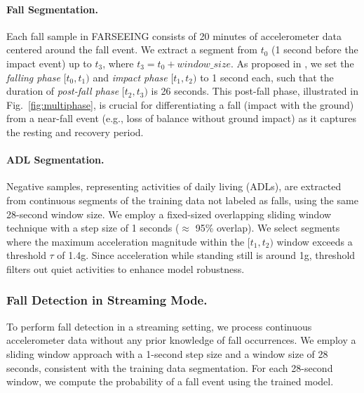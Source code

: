 \documentclass[runningheads]{llncs}
\begin{document}
\paragraph{Fall Segmentation.} Each fall sample in FARSEEING consists of 20 minutes of accelerometer data centered around the fall event. We extract a segment from $t_0$ (1 second before the impact event) up to $t_3$, where $t_3 = t_0 + window\_size$. As proposed in \cite{palmerini2020accelerometer}, we set the \textit{falling phase} $[t_0, t_1)$ and \textit{impact phase} $[t_1, t_2)$ to 1 second each, such that the duration of \textit{post-fall phase} $[t_2, t_3)$ is 26 seconds. This post-fall phase, illustrated in Fig.~\ref{fig:multiphase}, is crucial for differentiating a fall (impact with the ground) from a near-fall event (e.g., loss of balance without ground impact) as it captures the resting and recovery period.

\paragraph{ADL Segmentation.} Negative samples, representing activities of daily living (ADLs), are extracted from continuous segments of the training data not labeled as falls, using the same 28-second window size. We employ a fixed-sized overlapping sliding window technique with a step size of 1 seconds ($\approx$ 95\% overlap). We select segments where the maximum acceleration magnitude within the $[t_1, t_2)$ window exceeds a threshold $\tau$ of 1.4g. Since acceleration while standing still is around 1g, threshold filters out quiet activities to enhance model robustness.

\subsubsection{Fall Detection in Streaming Mode.}

To perform fall detection in a streaming setting, we process continuous accelerometer data without any prior knowledge of fall occurrences. We employ a sliding window approach with a 1-second step size and a window size of 28 seconds, consistent with the training data segmentation. For each 28-second window, we compute the probability of a fall event using the trained model.
\end{document}
